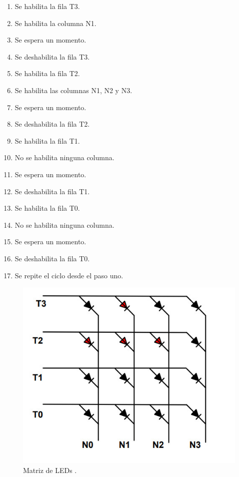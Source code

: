 \begin{enumerate}
\item Se habilita la fila T3.
\item Se habilita la columna N1.
\item Se espera un momento.
\item Se deshabilita la fila T3.
\item Se habilita la fila T2.
\item Se habilita las columnas N1, N2 y N3.
\item Se espera un momento.
\item Se deshabilita la fila T2.
\item Se habilita la fila T1.
\item No se habilita ninguna columna.
\item Se espera un momento.
\item Se deshabilita la fila T1.
\item Se habilita la fila T0.
\item No se habilita ninguna columna.
\item Se espera un momento.
\item Se deshabilita la fila T0.
\item Se repite el ciclo desde el paso uno.
\end{enumerate}


\begin{figure}[htpb]
	\centering
	\includegraphics[scale=0.5]{Figures/ledmatrix.jpg} 
	\caption{Matriz de LEDs \protect\footnotemark.}
	\label{fig:matrizled}
\end{figure}

